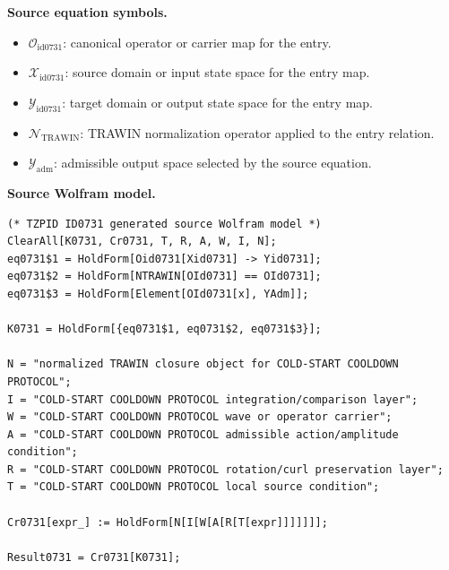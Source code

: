 \begin{minipage}[t]{0.49\linewidth}
\begingroup
\small
\raggedright
\textbf{Source equation symbols.}\par
\begin{itemize}[leftmargin=1.35em,itemsep=1pt,topsep=1pt,parsep=0pt]
    \item $\mathcal{O}_{\mathrm{id0731}}$: canonical operator or carrier map for the entry.
    \item $\mathcal{X}_{\mathrm{id0731}}$: source domain or input state space for the entry map.
    \item $\mathcal{Y}_{\mathrm{id0731}}$: target domain or output state space for the entry map.
    \item $\mathcal{N}_{\mathrm{TRAWIN}}$: TRAWIN normalization operator applied to the entry relation.
    \item $\mathcal{Y}_{\mathrm{adm}}$: admissible output space selected by the source equation.
\end{itemize}
\endgroup
\end{minipage}\hfill
\begin{minipage}[t]{0.47\linewidth}
\begingroup
\scriptsize
\raggedright
\textbf{Source Wolfram model.}\par
\begin{Verbatim}[fontsize=\tiny,breaklines=true,breakanywhere=true]
(* TZPID ID0731 generated source Wolfram model *)
ClearAll[K0731, Cr0731, T, R, A, W, I, N];
eq0731$1 = HoldForm[Oid0731[Xid0731] -> Yid0731];
eq0731$2 = HoldForm[NTRAWIN[OId0731] == OId0731];
eq0731$3 = HoldForm[Element[OId0731[x], YAdm]];

K0731 = HoldForm[{eq0731$1, eq0731$2, eq0731$3}];

N = "normalized TRAWIN closure object for COLD-START COOLDOWN PROTOCOL";
I = "COLD-START COOLDOWN PROTOCOL integration/comparison layer";
W = "COLD-START COOLDOWN PROTOCOL wave or operator carrier";
A = "COLD-START COOLDOWN PROTOCOL admissible action/amplitude condition";
R = "COLD-START COOLDOWN PROTOCOL rotation/curl preservation layer";
T = "COLD-START COOLDOWN PROTOCOL local source condition";

Cr0731[expr_] := HoldForm[N[I[W[A[R[T[expr]]]]]]];

Result0731 = Cr0731[K0731];
\end{Verbatim}
\endgroup
\end{minipage}

